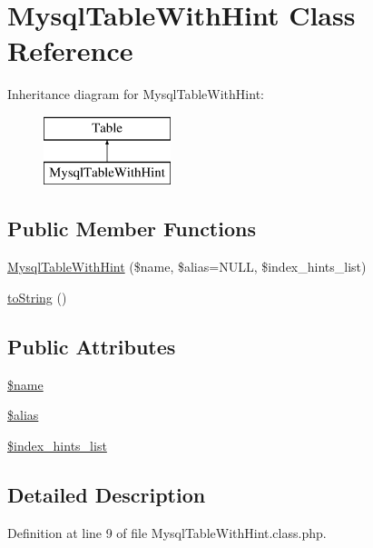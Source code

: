 \hypertarget{classMysqlTableWithHint}{}\section{Mysql\+Table\+With\+Hint Class Reference}
\label{classMysqlTableWithHint}
Inheritance diagram for Mysql\+Table\+With\+Hint\+:\begin{figure}[H]
\begin{center}
\leavevmode
\includegraphics[height=2.000000cm]{classMysqlTableWithHint}
\end{center}
\end{figure}
\subsection*{Public Member Functions}
\begin{DoxyCompactItemize}
\item 
\hyperlink{classMysqlTableWithHint_aa77b8f9ab560a504ab1e24786f77f3a7}{Mysql\+Table\+With\+Hint} (\$name, \$alias=N\+U\+L\+L, \$index\+\_\+hints\+\_\+list)
\item 
\hyperlink{classMysqlTableWithHint_ad4123d7369e2e100a6189767d3d7e78b}{to\+String} ()
\end{DoxyCompactItemize}
\subsection*{Public Attributes}
\begin{DoxyCompactItemize}
\item 
\hyperlink{classMysqlTableWithHint_a38c6eb1620ea15d06902d2fafb991776}{\$name}
\item 
\hyperlink{classMysqlTableWithHint_a71f2f396bdbde2b55444e8f142c31816}{\$alias}
\item 
\hyperlink{classMysqlTableWithHint_ac389d7382100dd008addab6fbbbe0032}{\$index\+\_\+hints\+\_\+list}
\end{DoxyCompactItemize}


\subsection{Detailed Description}


Definition at line 9 of file Mysql\+Table\+With\+Hint.\+class.\+php.



